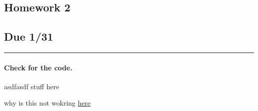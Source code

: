 \documentclass[../hw.tex]{subfiles}
\begin{document}
\begin{center}
    \section*{Homework 2}
    \subsection*{Due 1/31}
\end{center}
\hrule \vspace{10px}

\paragraph*{Check for the code.}
asdfasdf stuff here

why is this not wokring 
\href{../code/hw2.pdf}{here}
\end{document}
